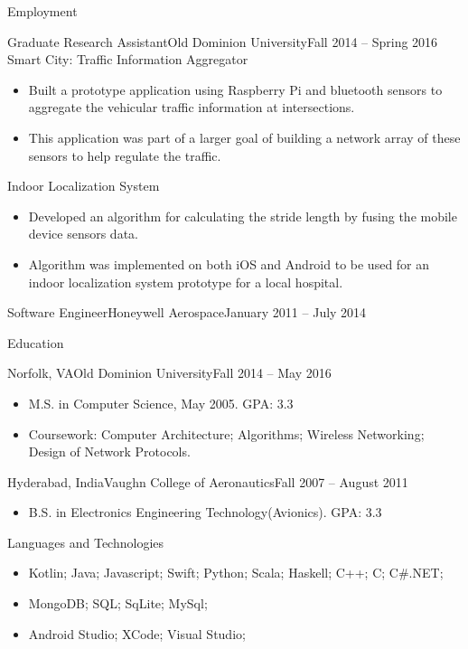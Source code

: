 \documentclass{mcdowellcv}
\begin{document}
\begin{cvsection}{Employment}
		\begin{cvsubsection}{Graduate Research Assistant}{Old Dominion University}{Fall 2014 -- Spring 2016}
			Smart City: Traffic Information Aggregator
			\begin{itemize}
				\item Built a prototype application using Raspberry Pi and bluetooth sensors to aggregate the vehicular traffic information at intersections.
				\item This application was part of a larger goal of building a network array of these sensors to help regulate the traffic.
			\end{itemize}
			Indoor Localization System
			\begin{itemize}
				\item Developed an algorithm for calculating the stride length by fusing the mobile device sensors data.
				\item Algorithm was implemented on both iOS and Android to be used for an indoor localization system prototype for a local hospital.
			\end{itemize}
		\end{cvsubsection}
		
		\begin{cvsubsection}{Software Engineer}{Honeywell Aerospace}{January 2011 -- July 2014}
		\end{cvsubsection}
	\end{cvsection}
	
	\begin{cvsection}{Education}
		\begin{cvsubsection}{Norfolk, VA}{Old Dominion University}{Fall 2014 -- May 2016}
			\begin{itemize}
				\item M.S. in Computer Science, May 2005. GPA: 3.3
				\item Coursework: Computer Architecture; Algorithms; Wireless Networking; Design of Network Protocols.
			\end{itemize}
		\end{cvsubsection}
		\begin{cvsubsection}{Hyderabad, India}{Vaughn College of Aeronautics}{Fall 2007 -- August 2011}
			\begin{itemize}
				\item B.S. in Electronics Engineering Technology(Avionics). GPA: 3.3
			\end{itemize}
		\end{cvsubsection}
	\end{cvsection}
	
	\begin{cvsection}{Languages and Technologies}
		\begin{cvsubsection}{}{}{}	
			\begin{itemize}
				\item Kotlin; Java; Javascript; Swift; Python; Scala; Haskell; C++; C; C\#.NET;
				\item MongoDB; SQL; SqLite; MySql;
                \item Android Studio; XCode; Visual Studio;
			\end{itemize}
		\end{cvsubsection}
	\end{cvsection}
	
\end{document}
